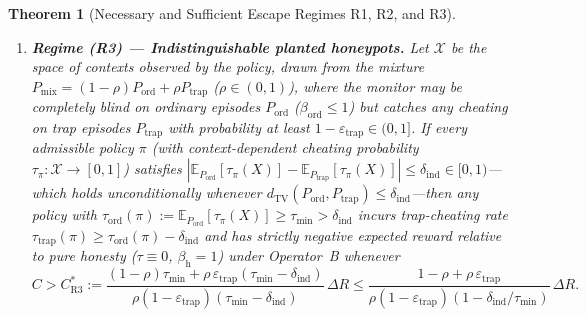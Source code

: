 \documentclass[11pt,a4paper]{article}
\newtheorem{theorem}{Theorem}
\newcommand{\E}{\mathbb{E}}
\newcommand{\dTV}{d_{\mathrm{TV}}}
\begin{document}
\begin{theorem}[Necessary and Sufficient Escape Regimes R1, R2, and R3]
\begin{enumerate}
  \item \textbf{Regime (R3) --- Indistinguishable planted honeypots.} Let $\mathcal{X}$ be the space of contexts observed by the policy, drawn from the mixture $P_{\mathrm{mix}} = (1-\rho)P_{\mathrm{ord}} + \rho P_{\mathrm{trap}}$ ($\rho \in (0, 1)$), where the monitor may be completely blind on ordinary episodes $P_{\mathrm{ord}}$ ($\beta_{\mathrm{ord}} \le 1$) but catches any cheating on trap episodes $P_{\mathrm{trap}}$ with probability at least $1 - \varepsilon_{\mathrm{trap}} \in (0, 1]$. If every admissible policy $\pi$ (with context-dependent cheating probability $\tau_{\pi} : \mathcal{X} \to [0, 1]$) satisfies $|\E_{P_{\mathrm{ord}}}[\tau_\pi(X)] - \E_{P_{\mathrm{trap}}}[\tau_\pi(X)]| \le \delta_{\mathrm{ind}} \in [0, 1)$---which holds unconditionally whenever $\dTV(P_{\mathrm{ord}}, P_{\mathrm{trap}}) \le \delta_{\mathrm{ind}}$---then any policy with $\tau_{\mathrm{ord}}(\pi) := \E_{P_{\mathrm{ord}}}[\tau_\pi(X)] \ge \tau_{\min} > \delta_{\mathrm{ind}}$ incurs trap-cheating rate $\tau_{\mathrm{trap}}(\pi) \ge \tau_{\mathrm{ord}}(\pi) - \delta_{\mathrm{ind}}$ and has strictly negative expected reward relative to pure honesty ($\tau \equiv 0$, $\beta_{\mathrm{h}} = 1$) under Operator~B whenever
  \begin{equation}\label{eq:R3}
    C > C_{\mathrm{R3}}^*
    := \frac{(1-\rho)\tau_{\min} + \rho\,\varepsilon_{\mathrm{trap}}(\tau_{\min} - \delta_{\mathrm{ind}})}{\rho(1 - \varepsilon_{\mathrm{trap}})(\tau_{\min} - \delta_{\mathrm{ind}})}\,\Delta R
    \le \frac{1 - \rho + \rho\,\varepsilon_{\mathrm{trap}}}{\rho(1 - \varepsilon_{\mathrm{trap}})(1 - \delta_{\mathrm{ind}}/\tau_{\min})}\,\Delta R.
  \end{equation}
\end{enumerate}
\end{theorem}
\end{document}
